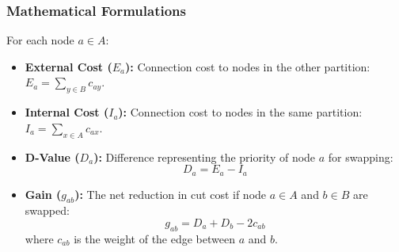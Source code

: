 \documentclass[12pt,a4paper]{article}
\begin{document}
\subsubsection{Mathematical Formulations}
For each node $a \in A$:
\begin{itemize}[leftmargin=*, itemsep=2pt]
  \item \textbf{External Cost ($E_a$):} Connection cost to nodes in the other partition: $E_a = \sum_{y \in B} c_{ay}$.
  \item \textbf{Internal Cost ($I_a$):} Connection cost to nodes in the same partition: $I_a = \sum_{x \in A} c_{ax}$.
  \item \textbf{D-Value ($D_a$):} Difference representing the priority of node $a$ for swapping:
        \begin{equation}
          D_a = E_a - I_a
        \end{equation}
  \item \textbf{Gain ($g_{ab}$):} The net reduction in cut cost if node $a \in A$ and $b \in B$ are swapped:
        \begin{equation}
          g_{ab} = D_a + D_b - 2c_{ab}
        \end{equation}
        where $c_{ab}$ is the weight of the edge between $a$ and $b$.
\end{itemize}
\end{document}

